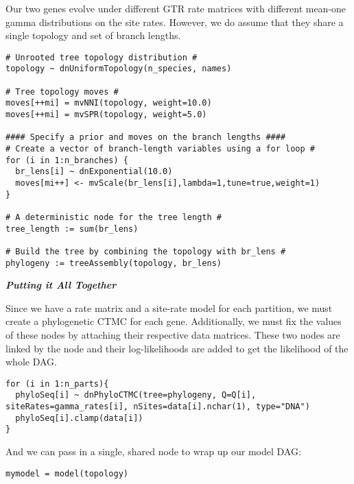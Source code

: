 Our two genes evolve under different GTR rate matrices with different mean-one gamma distributions on the site rates.
However, we do assume that they share a single topology and set of branch lengths.
{\tt \begin{snugshade*}
\begin{lstlisting}
# Unrooted tree topology distribution #
topology ~ dnUniformTopology(n_species, names)

# Tree topology moves #
moves[++mi] = mvNNI(topology, weight=10.0)
moves[++mi] = mvSPR(topology, weight=5.0)

#### Specify a prior and moves on the branch lengths #### 
# Create a vector of branch-length variables using a for loop #
for (i in 1:n_branches) {
  br_lens[i] ~ dnExponential(10.0)
  moves[mi++] <- mvScale(br_lens[i],lambda=1,tune=true,weight=1) 
}

# A deterministic node for the tree length #
tree_length := sum(br_lens)

# Build the tree by combining the topology with br_lens #
phylogeny := treeAssembly(topology, br_lens)
\end{lstlisting}
\end{snugshade*}}

\textbf{\textit{Putting it All Together}}

Since we have a rate matrix and a site-rate model for each partition, we must create a phylogenetic CTMC for each gene. 
Additionally, we must fix the values of these nodes by attaching their respective data matrices.
These two nodes are linked by the  node and their log-likelihoods are added to get the likelihood of the whole DAG.
{\tt \begin{snugshade*}
\begin{lstlisting}
for (i in 1:n_parts){
  phyloSeq[i] ~ dnPhyloCTMC(tree=phylogeny, Q=Q[i], siteRates=gamma_rates[i], nSites=data[i].nchar(1), type="DNA")
  phyloSeq[i].clamp(data[i])
}
\end{lstlisting}
\end{snugshade*}}


And we can pass in a single, shared node to wrap up our model DAG:
{\tt \begin{snugshade*}
\begin{lstlisting}
mymodel = model(topology)
\end{lstlisting}
\end{snugshade*}}
